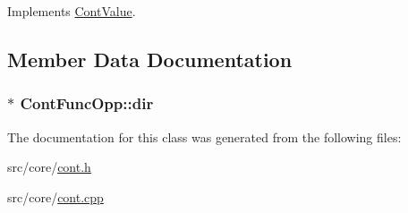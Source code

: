 Implements \hyperlink{a00086_ae3ce98084899bf1a873a1ec6bf15116e}{Cont\-Value}.



\subsection{Member Data Documentation}
\hypertarget{a00057_ae5a5be8f69b24e66e27c07368ada1024}{
\subsubsection[{dir}]{$\ast$ Cont\-Func\-Opp\-::dir\hspace{0.3cm}{\ttfamily [private]}}}\label{a00057_ae5a5be8f69b24e66e27c07368ada1024}


The documentation for this class was generated from the following files\-:\begin{DoxyCompactItemize}
\item 
src/core/\hyperlink{a00218}{cont.\-h}\item 
src/core/\hyperlink{a00217}{cont.\-cpp}\end{DoxyCompactItemize}
